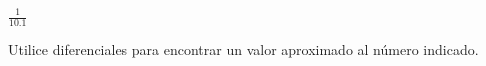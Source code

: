 \item $\displaystyle \frac{1}{10.1}$
\par
Utilice diferenciales para encontrar un valor aproximado al número indicado.
